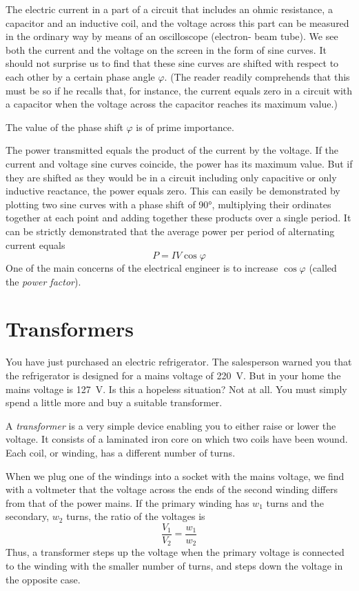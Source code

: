 The electric current in a part of a circuit that includes an ohmic resistance, a capacitor and an inductive coil, and the voltage across this part can be measured in the ordinary way by means of an oscilloscope (electron- beam tube). We see both the current and the voltage on the screen in the form of sine curves. It should not surprise us to find that these sine curves are shifted with respect to each other by a certain phase angle $\varphi$. (The reader readily comprehends that this must be so if he recalls that, for instance, the current equals zero in a circuit with a capacitor when the voltage across the capacitor reaches its maximum value.)

The value of the phase shift $\varphi$ is of prime importance.

The power transmitted equals the product of the current by the voltage. If the current and voltage sine curves coincide, the power has its maximum value. But if they are shifted as they would be in a circuit including only capacitive or only inductive reactance, the power equals zero. This can easily be demonstrated by plotting two sine curves with a phase shift of \ang{90}, multiplying their ordinates together at each point and adding together these products over a single period. It can be strictly demonstrated that the average power per period of alternating current equals
\begin{equation*}%
P = IV \cos \varphi
\end{equation*}
One of the main concerns of the electrical engineer
is to increase $\cos \varphi$ (called the \emph{power factor}). 

\section{Transformers}

You have just purchased an electric refrigerator. The salesperson warned you that the refrigerator is designed for a mains voltage of \SI{220}{\volt}. But in your home the mains voltage is \SI{127}{\volt}. Is this a hopeless situation? Not at all. You must simply spend a little more and buy a suitable transformer.

A \emph{transformer} is a very simple device enabling you to either raise or lower the voltage. It consists of a laminated iron core on which two coils have been wound. Each coil, or winding, has a different number of turns.

When we plug one of the windings into a socket with the mains voltage, we find with a voltmeter that the voltage across the ends of the second winding differs from that of the power mains. If the primary winding has $w_{1}$ turns and the secondary, $w_{2}$ turns, the ratio of the voltages is
\begin{equation*}%
\frac{V_{1}}{V_{2}} = \frac{w_{1}}{w_{2}} 
\end{equation*}
Thus, a transformer steps up the voltage when the primary voltage is connected to the winding with the smaller number of turns, and steps down the voltage in the opposite case.

